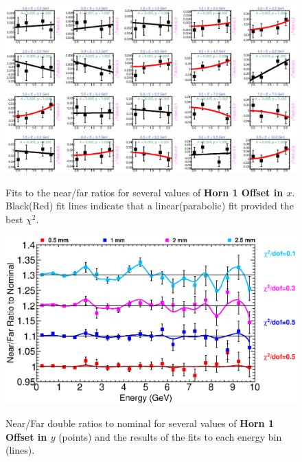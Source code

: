 {\begin{figure}[ht]
  \begin{center}
    {\includegraphics[width=5.0in]{figures/Horn1XOffset_nof_fits.eps}}
  \end{center}
\caption{ Fits to the near/far ratios for several values of {\bf Horn 1 Offset in $x$}. Black(Red) fit lines indicate that a linear(parabolic) fit provided the best $\chi^2$. }
\end{figure}

\begin{figure}[ht]
  \begin{center}
    {\includegraphics[width=6.0in]{figures/Horn1YOffset_nof_summary.eps}}
  \end{center}
\caption{ Near/Far double ratios to nominal for several values of {\bf Horn 1 Offset in $y$} (points) and the results of the fits to each energy bin (lines).}
\end{figure}

}
